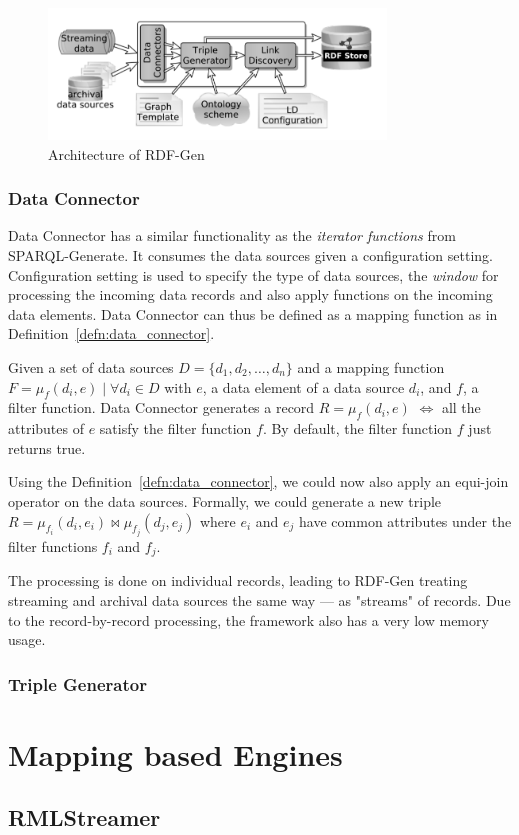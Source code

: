 \begin{figure}[!htbp]
  \centering
  \includegraphics[width=0.8\textwidth]{fig/rdf-gen-arch.png}
  \caption{Architecture of RDF-Gen\cite{rdf_gen}}
  \label{fig:rdf-gen-arch}
\end{figure}

\subsubsection{Data Connector}
Data Connector has a similar functionality as the \emph{iterator functions} from SPARQL-Generate.
It consumes the data sources given a configuration setting. Configuration setting is used to specify 
the type of data sources, the \emph{window} for processing the incoming data records and 
also apply functions on the incoming data elements. Data Connector can thus be defined as a 
mapping function as in Definition~\ref{defn:data_connector}. 


\begin{defn}
  \label{defn:data_connector}
  Given a set of data sources $D = \{d_1, d_2, \dots, d_n\}$ and  a 
  mapping function $F = \mu_{f}(d_i, e)\; |\; \forall d_i \in D$ with $e$, a data element 
  of a data source $d_i$, and $f$, a filter function. Data Connector 
  generates a record $R = \mu_{f}(d_i, e)$ $\iff$ all the attributes of 
  $e$ satisfy the filter function $f$. By default, the filter function $f$ just returns true. 
\end{defn}

Using the Definition~\ref{defn:data_connector}, we could now also apply an equi-join operator 
on the data sources. Formally, we could generate a new triple 
$R =  \mu_{f_i}(d_i, e_i) \bowtie  \mu_{f_j}(d_j, e_j) $ where $e_i$ and $e_j$ have 
common attributes under the filter functions $f_i$ and $f_j$. 

The processing is done on individual records, leading to 
RDF-Gen treating streaming and archival data sources the same way --- as "streams" 
of records. Due to the record-by-record processing, the framework also has a very low 
memory usage. 

\subsubsection{Triple Generator}


\section{Mapping based Engines}

\subsection{RMLStreamer}

